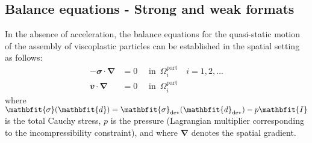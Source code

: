 \documentclass[12pt,a4paper,fleqn]{article}
\renewcommand{\ta}[1]{\mathbfit{#1}}
\renewcommand{\ts}[1]{\mathbfit{#1}}
\renewcommand{\diff}{\mathbfup{\nabla}}
\newcommand{\particle}{\mathrm{part}}
\newcommand{\surf}{\mathrm{s}}
\begin{document}
%
%

\subsection{Balance equations - Strong and weak formats}

In the absence of acceleration, the balance equations for the quasi-static motion of the assembly of viscoplastic particles can be established in the spatial setting as follows:
\begin{subequations}\label{eq:strong_form}
\begin{align}
    -\ts{\sigma}\cdot\diff & = \ts{0} \quad \mbox{ in }\,\Omega^\particle_i\quad i = 1,2,...
\label{eq:strong_form_v}
\\
    \ta{v}\cdot\diff & = 0 \quad \mbox{ in }\,\Omega^\particle_i
\label{eq:strong_form_p}
\end{align}
\end{subequations}
where $\ts{\sigma}(\ts{d})=\ts{\sigma}_\dev(\ts{d}_\dev)-p\ts{I}$ is the total Cauchy stress, $p$ is the pressure (Lagrangian multiplier corresponding to the incompressibility constraint), and
where $\diff$ denotes the spatial gradient.
\end{document}
